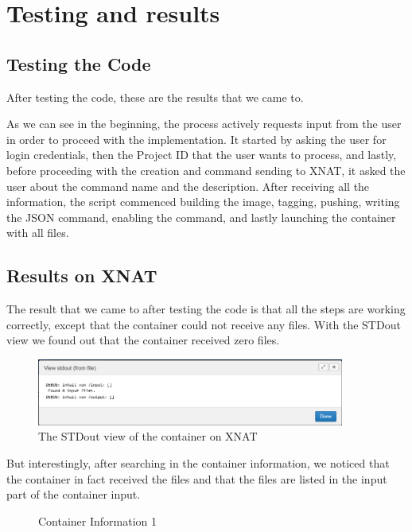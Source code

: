 
\chapter{Testing and results}
\section{Testing the Code}
After testing the code, these are the results that we came to. 

As we can see in the beginning, the process actively requests input from the user in order to proceed with the implementation. It started by asking the user for login credentials, then the Project ID that the user wants to process, and lastly, before proceeding with the creation and command sending to XNAT, it asked the user about the command name and the description.
After receiving all the information, the script commenced building the image, tagging, pushing, writing the JSON command, enabling the command, and lastly launching the container with all files.

\section{Results on XNAT}
The result that we came to after testing the code is that all the steps are working correctly, except that the container could not receive any files. With the \ac{STDout} view we found out that the container received zero files. 
 
\begin{figure}
    \centering
    \includegraphics[width=0.9\textwidth]{en/content/STDOUT view.png}
    \caption{The STDout view of the container on XNAT}
    \label{fig:enter-label}
\end{figure}

But interestingly, after searching in the container information, we noticed that the container in fact received the files and that the files are listed in the input part of the container input. 

\begin{figure}[p]
    \centering
    \caption{Container Information 1}
    \label{fig:container-info-1}
\end{figure}

